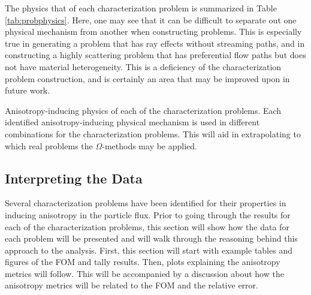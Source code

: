 The physics that of each characterization problem is summarized in Table \ref{tab:probphysics}.
Here, one may see that it can be difficult to separate
out one physical mechanism from another when constructing problems. This is
especially true in generating a problem that has ray effects without streaming
paths, and in constructing a highly scattering problem that has preferential
flow paths but does not have material heterogeneity. This is a
deficiency of the characterization problem construction, and is certainly an
area that may be improved upon in future work.

\begin{table}[h!]
  \centering
  
  \caption[Anisotropy-inducing physics of each of the characterization problems.]
  {Anisotropy-inducing physics of each of the characterization problems.
  Each identified anisotropy-inducing physical mechanism is used in different
  combinations for the characterization problems. This will aid in
  extrapolating to which real problems the $\Omega$-methods may be applied.}
  \label{tab:probphysics}
\end{table}


\subsection{Interpreting the Data}
\label{subsec:resultsintro}

Several characterization problems have been identified for their
properties in inducing anisotropy in the particle flux.
Prior to going through the results for each of the characterization problems,
this section will show how the data for each problem will be presented and will
walk through the reasoning behind this approach to the analysis. First, this
section will start with example tables and figures of the FOM and tally results.
Then, plots explaining the anisotropy metrics will follow. This will be
accompanied by a
discussion about how the anisotropy metrics will be related to the FOM and the
relative error.

